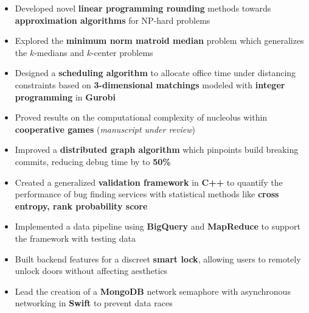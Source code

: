 \documentclass[11pt,a4paper,ragged2e]{altacv}
\begin{document}
\begin{paracol}{2}
\makecvheader

\begin{itemize}
    \item Developed novel \textbf{linear programming rounding} methods
      towards \textbf{approximation algorithms} for NP-hard problems
    \item Explored the \textbf{minimum norm matroid median} problem
      which generalizes the $k$-medians and $k$-center problems
\end{itemize}

\divider

\begin{itemize}
    \item Designed a \textbf{scheduling algorithm} to allocate office time under distancing constraints
      based on \textbf{3-dimensional matchings} modeled with \textbf{integer programming} in \textbf{Gurobi}
    \item Proved results on the computational complexity of nucleolus
      within \textbf{cooperative games}
      (\emph{manuscript under review})
\end{itemize}

\divider

\begin{itemize}
    \item Improved a \textbf{distributed graph algorithm} which pinpoints build breaking commits,
      reducing debug time by to \textbf{50\%}
    \item Created a generalized \textbf{validation framework} in \textbf{C++}
      to quantify the performance of bug finding services
      with statistical methods like \textbf{cross entropy, rank probability score}
    \item Implemented a data pipeline using \textbf{BigQuery} and \textbf{MapReduce}
      to support the framework with testing data
\end{itemize}

\divider

\begin{itemize}
    \item Built backend features for a discreet \textbf{smart lock},
      allowing users to remotely unlock doors without affecting aesthetics
    \item Lead the creation of a \textbf{MongoDB} network semaphore with asynchronous networking in \textbf{Swift}
      to prevent data races
\end{itemize}


\end{paracol}
\end{document}
